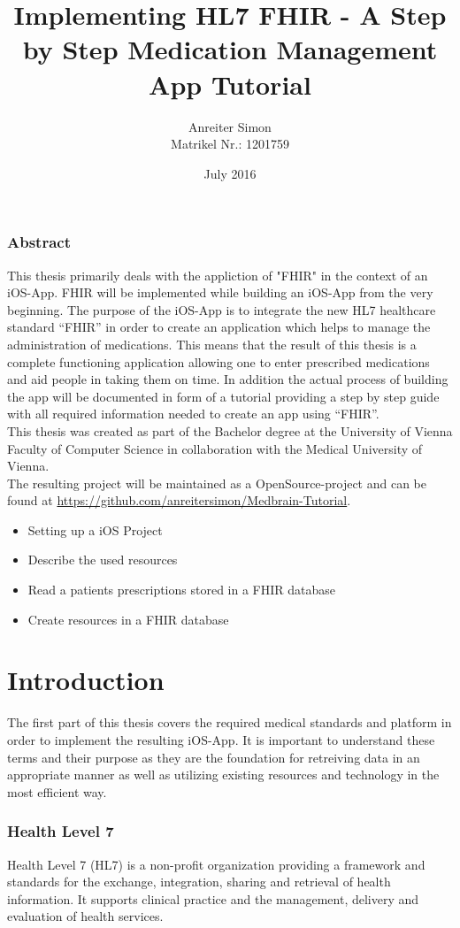\documentclass{article}
\title{Implementing HL7 FHIR - A Step by Step Medication Management App Tutorial}
\author{
    \large{Anreiter Simon} \\
    \small{Matrikel Nr.: 1201759}
}
\date{July 2016}
\begin{document}


\section*{Abstract}
This thesis primarily deals with the appliction of "FHIR" in the context of an iOS-App.
FHIR will be implemented while building an iOS-App from the very beginning. The purpose of the iOS-App is to integrate the new HL7 healthcare standard “FHIR” in order to create an application which helps to manage the administration of medications. This means that the result of this thesis is a complete functioning application allowing one to enter prescribed medications and aid people in taking them on time. In addition the actual process of building the app will be documented in form of a tutorial providing a step by step guide with all required information needed to create an app using “FHIR”.
\\
This thesis was created as part of the Bachelor degree at the University of Vienna Faculty of Computer Science in collaboration with the Medical University of Vienna.
\\
The resulting project will be maintained as a OpenSource-project and can be found at \url{https://github.com/anreitersimon/Medbrain-Tutorial}.
\\
\begin{itemize}
  \item
    Setting up a iOS Project
  \item
    Describe the used resources
  \item
    Read a patients prescriptions stored in a FHIR database
  \item
    Create resources in a FHIR database
\end{itemize}
\newpage

\tableofcontents
\newpage

\part{Introduction}
The first part of this thesis covers the required medical standards and platform in order to implement the resulting iOS-App. It is important to understand these terms and their purpose as they are the foundation for retreiving data in an appropriate manner as well as utilizing existing resources and technology in the most efficient way.

\section{Health Level 7}
Health Level 7 (HL7) is a non-profit organization providing a framework and standards for the exchange, integration, sharing and retrieval of health information.
It supports clinical practice and the management, delivery and evaluation of health services. \citep{hl7}
\end{document}
